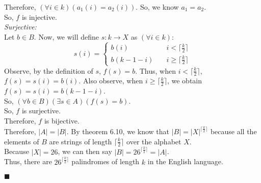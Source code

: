 \documentclass[11pt,a4paper]{article}
\begin{document}
\begin{enumerate}
    Therefore, $(\forall i \in k)(a_1(i) = a_2(i)) $. So, we know $a_1 = a_2 $. \\
    So, $f$ is injective. \\
    \emph{Surjective:} \\
    Let $b \in B$. Now, we will define $s: k \rightarrow X $ as $(\forall i \in k)$: 
    $$
    s(i) =
    \begin{cases}
      b(i) &\quad i < \lceil \frac{k}{2} \rceil \\
      b(k - 1 - i) &\quad i \geq \lceil \frac{k}{2} \rceil
    \end{cases}
    $$
    Observe, by the definition of $s$, $f(s) = b $. Thus, when $i < \lceil \frac{k}{2} \rceil $, $f(s) = s(i) = b(i) $. 
    Also observe, when $i \geq \lceil \frac{k}{2} \rceil $, we obtain $f(s) = s(i) = b(k - 1 - i) $. \\
    So, $(\forall b \in B)(\exists s \in A)(f(s) = b) $. \\
    So, $f$ is surjective. \\
    Therefore, $f$ is bijective. \\
    Therefore, $|A| = |B| $. By theorem 6.10, we know that $|B| = |X|^{\lceil \frac{k}{2} \rceil} $ because all the elements of $B$ are strings of length $\lceil \frac{k}{2} \rceil $ over the alphabet $X$. \\
    Because $|X| = 26$, we can then say $|B| = 26^{\lceil \frac{k}{2} \rceil} = |A|$. \\
    Thus, there are $26^{\lceil \frac{k}{2} \rceil} $ palindromes of length $k$ in the English language.
    \begin{flushright}
      $\blacksquare$
    \end{flushright}
    

\end{enumerate}
\end{document}
